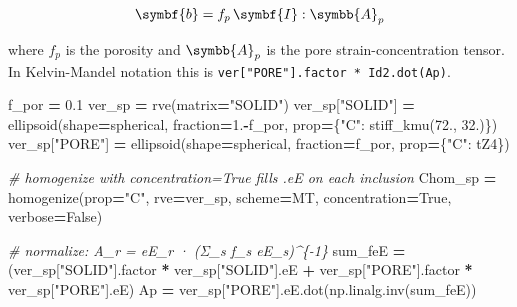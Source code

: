 \documentclass[
  a4paper,
  numbers=noendperiod,
  DIV=12]{scrreprt}
\newenvironment{Shaded}{\begin{snugshade}}{\end{snugshade}}
\newcommand{\CommentTok}[1]{\textcolor[rgb]{0.56,0.35,0.01}{\textit{#1}}}
\newcommand{\FloatTok}[1]{\textcolor[rgb]{0.00,0.00,0.81}{#1}}
\newcommand{\NormalTok}[1]{#1}
\newcommand{\OperatorTok}[1]{\textcolor[rgb]{0.81,0.36,0.00}{\textbf{#1}}}
\newcommand{\StringTok}[1]{\textcolor[rgb]{0.31,0.60,0.02}{#1}}
\newcommand{\VariableTok}[1]{\textcolor[rgb]{0.00,0.00,0.00}{#1}}
\newcommand{\uu}[1]{{\symbf{{#1}}}}
\newcommand{\uuuu}[1]{{\symbb{{#1}}}}
\begin{document}
\[
\uu{b} = f_p\,\uu{I} : \uuuu{A}_p
\]

where \(f_p\) is the porosity and \(\uuuu{A}_p\) is the pore
strain-concentration tensor. In Kelvin-Mandel notation this is
\texttt{ver{[}"PORE"{]}.factor\ *\ Id2.dot(Ap)}.

\begin{Shaded}
\begin{Highlighting}[]
\NormalTok{f\_por }\OperatorTok{=} \FloatTok{0.1}
\NormalTok{ver\_sp }\OperatorTok{=}\NormalTok{ rve(matrix}\OperatorTok{=}\StringTok{"SOLID"}\NormalTok{)}
\NormalTok{ver\_sp[}\StringTok{"SOLID"}\NormalTok{] }\OperatorTok{=}\NormalTok{ ellipsoid(shape}\OperatorTok{=}\NormalTok{spherical, fraction}\OperatorTok{=}\FloatTok{1.}\OperatorTok{{-}}\NormalTok{f\_por,}
\NormalTok{                             prop}\OperatorTok{=}\NormalTok{\{}\StringTok{"C"}\NormalTok{: stiff\_kmu(}\FloatTok{72.}\NormalTok{, }\FloatTok{32.}\NormalTok{)\})}
\NormalTok{ver\_sp[}\StringTok{"PORE"}\NormalTok{]  }\OperatorTok{=}\NormalTok{ ellipsoid(shape}\OperatorTok{=}\NormalTok{spherical, fraction}\OperatorTok{=}\NormalTok{f\_por,}
\NormalTok{                             prop}\OperatorTok{=}\NormalTok{\{}\StringTok{"C"}\NormalTok{: tZ4\})}

\CommentTok{\# homogenize with concentration=True fills .eE on each inclusion}
\NormalTok{Chom\_sp }\OperatorTok{=}\NormalTok{ homogenize(prop}\OperatorTok{=}\StringTok{"C"}\NormalTok{, rve}\OperatorTok{=}\NormalTok{ver\_sp, scheme}\OperatorTok{=}\NormalTok{MT,}
\NormalTok{                     concentration}\OperatorTok{=}\VariableTok{True}\NormalTok{, verbose}\OperatorTok{=}\VariableTok{False}\NormalTok{)}

\CommentTok{\# normalize: A\_r = eE\_r · (Σ\_s f\_s eE\_s)\^{}\{{-}1\}}
\NormalTok{sum\_feE }\OperatorTok{=}\NormalTok{ (ver\_sp[}\StringTok{"SOLID"}\NormalTok{].factor }\OperatorTok{*}\NormalTok{ ver\_sp[}\StringTok{"SOLID"}\NormalTok{].eE}
         \OperatorTok{+}\NormalTok{ ver\_sp[}\StringTok{"PORE"}\NormalTok{].factor  }\OperatorTok{*}\NormalTok{ ver\_sp[}\StringTok{"PORE"}\NormalTok{].eE)}
\NormalTok{Ap }\OperatorTok{=}\NormalTok{ ver\_sp[}\StringTok{"PORE"}\NormalTok{].eE.dot(np.linalg.inv(sum\_feE))}


\end{Highlighting}
\end{Shaded}
\end{document}
